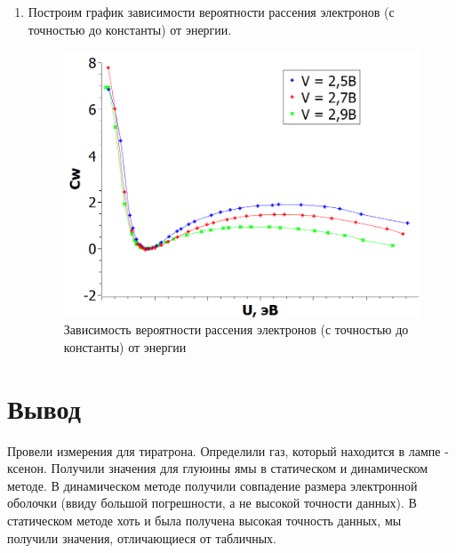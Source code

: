 \documentclass[a4paper,12pt]{article} %
\begin{document}
\begin{enumerate}
\item Построим график зависимости вероятности рассения электронов (с точностью до константы) от энергии.

\begin{figure}[h!]
\centering
\includegraphics[width = 0.9\linewidth]{images/graph_2.png}
\caption{Зависимость вероятности рассения электронов (с точностью до константы) от энергии}
\label{graph_2}
\end{figure}

\end{enumerate}

\section{Вывод}

Провели измерения для тиратрона. Определили газ, который находится в лампе - ксенон. Получили значения для глуюины ямы в статическом и динамическом методе. В динамическом методе получили совпадение размера электронной оболочки (ввиду большой погрешности, а не высокой точности данных). В статическом методе хоть и была получена высокая точность данных, мы получили значения, отличающиеся от табличных.
\end{document}
